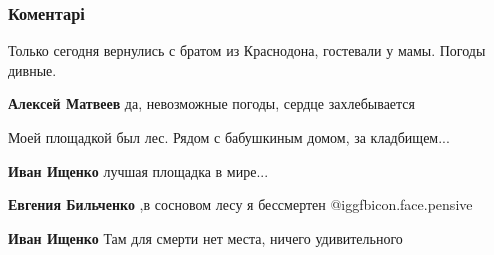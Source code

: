  
 
 
 
 
\subsubsection{Коментарі}

\begin{itemize} %
Только сегодня вернулись с братом из Краснодона, гостевали у мамы. Погоды дивные.

\textbf{Алексей Матвеев} да, невозможные погоды, сердце захлебывается

Моей площадкой был лес. Рядом с бабушкиным домом, за кладбищем...🤭

\textbf{Иван Ищенко} лучшая площадка в мире...

\textbf{Евгения Бильченко} ,в сосновом лесу я бессмертен @igg{fbicon.face.pensive} 

\textbf{Иван Ищенко} Там для смерти нет места, ничего удивительного
\end{itemize} %

